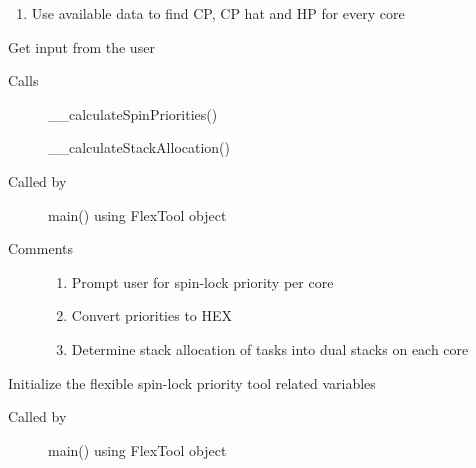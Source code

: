 \documentclass[letterpaper,10pt,english]{sphinxmanual}
\begin{document}
\begin{fulllineitems}
\begin{fulllineitems}
\begin{description}
\begin{enumerate}
\item {} 
Use available data to find CP, CP hat and HP for every core

\end{enumerate}

\end{description}

\end{fulllineitems}


\begin{fulllineitems}
\label{\detokenize{code:FlexTool.FlexTool.getUserInput}}
Get input from the user
\begin{description}
\item[{Calls}] \leavevmode{[}{]}
\_\_calculateSpinPriorities()

\_\_calculateStackAllocation()

\item[{Called by}] \leavevmode{[}{]}
main() using FlexTool object

\item[{Comments}] \leavevmode{[}{]}\begin{enumerate}
\item {} 
Prompt user for spin-lock priority per core

\item {} 
Convert priorities to HEX

\item {} 
Determine stack allocation of tasks into dual stacks on each core

\end{enumerate}

\end{description}

\end{fulllineitems}


\begin{fulllineitems}
\label{\detokenize{code:FlexTool.FlexTool.initializeFlexSpinToolVars}}
Initialize the flexible spin-lock priority tool related variables
\begin{description}
\item[{Called by}] \leavevmode{[}{]}
main() using FlexTool object


\end{description}
\end{fulllineitems}
\end{fulllineitems}
\end{document}
